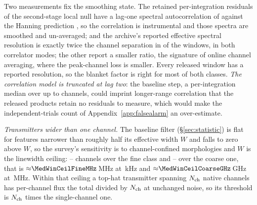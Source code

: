 Two measurements fix the smoothing state. The retained per-integration
residuals of the second-stage local null have a lag-one spectral
autocorrelation of \LNLagOne{} against the Hanning prediction \HanRhoOne, so
the correlation is instrumental and those spectra are smoothed and
un-averaged; and the archive's reported effective spectral resolution is
exactly twice the channel separation in \NHanTwo{} of the \NHanKnown{}
windows, in both correlator modes; the other \NHanOther{} report a smaller
ratio, the signature of online channel averaging, where the peak-channel loss
is smaller. Every released window has a reported resolution, so the blanket
factor is right for most of both classes. \emph{The correlation model is truncated at
lag two}: the baseline step, a per-integration median over up to \MedWin{}
channels, could imprint longer-range correlation that the released products
retain no residuals to measure, which would make the independent-trials count
of Appendix~\ref{app:falsealarm} an over-estimate.

\emph{Transmitters wider than one channel.} The baseline filter
(\S\ref{sec:statistic}) is flat for features narrower than roughly half its
effective width $W$ and falls to zero above $W$, so the survey's sensitivity
is to channel-confined morphologies and $W$ is the linewidth ceiling:
\MedWinFineLo--\MedWinFineHi{} channels over the fine class and
\MedWinCoarseLo--\MedWinCoarseHi{} over the coarse one, that is
${\approx}\MedWinCeilFineMHz$\,MHz at \ChanFineKHz\,kHz and
${\approx}\MedWinCeilCoarseGHz$\,GHz at \ChanCoarseMHz\,MHz. Within that
ceiling a top-hat transmitter spanning $N_{\rm ch}$ native channels has
per-channel flux the total divided by $N_{\rm ch}$ at unchanged noise, so
its threshold is $N_{\rm ch}$ times the single-channel one.

